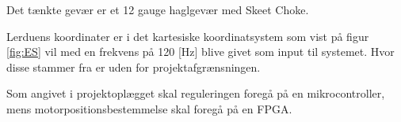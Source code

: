 Det tænkte gevær er et 12 gauge haglgevær med Skeet Choke.

Lerduens koordinater er i det kartesiske koordinatsystem som vist på figur \ref{fig:ES}
vil med en frekvens på 120 [Hz] blive givet som input til systemet. 
Hvor disse stammer fra er uden for projektafgrænsningen. 

Som angivet i projektoplægget skal reguleringen foregå på en mikrocontroller,
mens motorpositionsbestemmelse skal foregå på en FPGA.